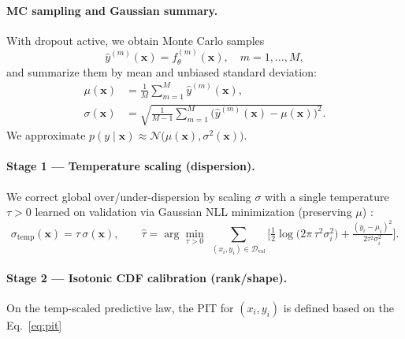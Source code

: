 \documentclass{article}
\begin{document}
\paragraph{MC sampling and Gaussian summary.}
With dropout active, we obtain Monte Carlo samples
\begin{equation}
\label{eq:mc-samples}
\hat{y}^{(m)}(\mathbf{x}) = f_{\theta}^{(m)}(\mathbf{x}), \quad m=1,\dots,M,
\end{equation}
and summarize them by mean and unbiased standard deviation:
\begin{align}
\label{eq:mu-mc}
\mu(\mathbf{x}) &= \frac{1}{M}\sum_{m=1}^M \hat{y}^{(m)}(\mathbf{x}),\\
\label{eq:sigma-mc}
\sigma(\mathbf{x}) &= \sqrt{\frac{1}{M-1}\sum_{m=1}^M \big(\hat{y}^{(m)}(\mathbf{x})-\mu(\mathbf{x})\big)^2 }.
\end{align}
We approximate $p(y\mid\mathbf{x}) \approx \mathcal{N}\!\big(\mu(\mathbf{x}),\sigma^2(\mathbf{x})\big)$.

\paragraph{Stage 1 — Temperature scaling (dispersion).}
We correct global over/under-dispersion by scaling $\sigma$ with a single temperature $\tau>0$ learned on validation via Gaussian NLL minimization (preserving $\mu$) \citep[cf.][]{guo2017calibration}:
\begin{equation}
\sigma_{\text{temp}}(\mathbf{x}) = \tau\,\sigma(\mathbf{x}),\qquad
\hat{\tau} = \arg\min_{\tau>0}\; \sum_{(x_i,y_i)\in\mathcal{D}_{\text{val}}}
\Big[\tfrac{1}{2}\log\!\big(2\pi\,\tau^2\sigma_i^2\big) + \tfrac{(y_i-\mu_i)^2}{2\tau^2\sigma_i^2}\Big].
\label{eq:tau-nll}
\end{equation}

\paragraph{Stage 2 — Isotonic CDF calibration (rank/shape).}
On the temp-scaled predictive law, the PIT for $(x_i,y_i)$ is defined based on the Eq.~\ref{eq:pit}
\end{document}
